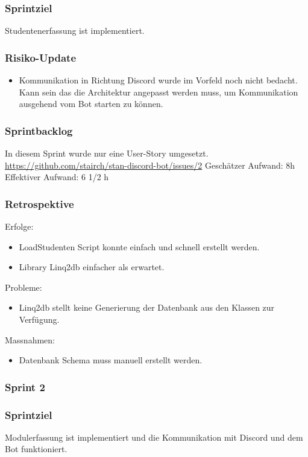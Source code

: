 \documentclass[a4paper, table]{article}
\begin{document}
\subsubsection*{Sprintziel}
Studentenerfassung ist implementiert.

\subsubsection*{Risiko-Update}
\begin{itemize}
    \item Kommunikation in Richtung Discord wurde im Vorfeld noch nicht bedacht.
    Kann sein das die Architektur angepasst werden muss, um Kommunikation ausgehend vom Bot starten zu können.
\end{itemize}

\subsubsection*{Sprintbacklog}
In diesem Sprint wurde nur eine User-Story umgesetzt.\\
\url{https://github.com/stairch/stan-discord-bot/issues/2}
\newline
Geschätzer Aufwand: 8h
\newline
Effektiver Aufwand: 6 1/2 h

\subsubsection*{Retrospektive}
Erfolge:
\begin{itemize}
    \item LoadStudenten Script konnte einfach und schnell erstellt werden.
    \item Library Linq2db einfacher als erwartet.
\end{itemize}
Probleme:
\begin{itemize}
    \item Linq2db stellt keine Generierung der Datenbank aus den Klassen zur Verfügung.
\end{itemize}
Massnahmen:
\begin{itemize}
    \item Datenbank Schema muss manuell erstellt werden.
\end{itemize}
\newpage

\subsubsection{Sprint 2}
\subsubsection*{Sprintziel}
Modulerfassung ist implementiert und die Kommunikation mit Discord und dem Bot funktioniert.
\end{document}
